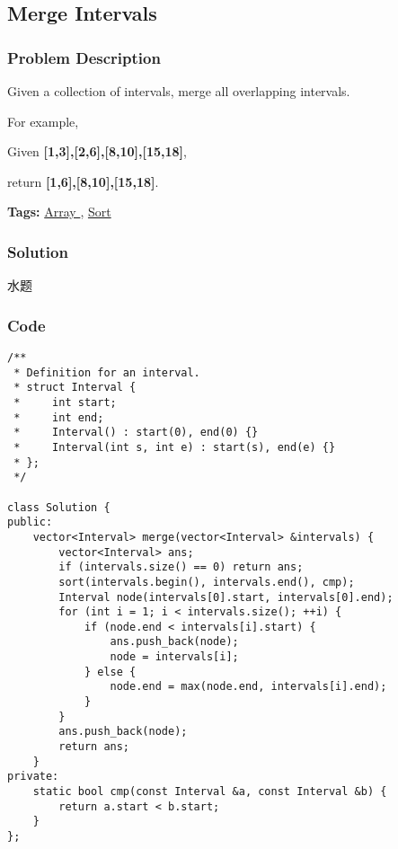 \documentclass{article}
\begin{document}
\begin{CJK*}{UTF8}{gkai}
\begin{lstlisting}
\end{lstlisting}


\subsection{ Merge Intervals }
\label{ Merge Intervals }

\subsubsection*{Problem Description}
Given a collection of intervals, merge all overlapping intervals.

For example,


Given \textbf{[1,3],[2,6],[8,10],[15,18]},


return \textbf{[1,6],[8,10],[15,18]}.


\textbf{Tags: }
\hyperref[ Array ]{ Array },  \hyperref[ Sort ]{ Sort }



\subsubsection*{Solution}
水题

\subsubsection*{Code}
\begin{lstlisting}
/**
 * Definition for an interval.
 * struct Interval {
 *     int start;
 *     int end;
 *     Interval() : start(0), end(0) {}
 *     Interval(int s, int e) : start(s), end(e) {}
 * };
 */
 
class Solution {
public:
    vector<Interval> merge(vector<Interval> &intervals) {
        vector<Interval> ans;
        if (intervals.size() == 0) return ans;
        sort(intervals.begin(), intervals.end(), cmp);
        Interval node(intervals[0].start, intervals[0].end);
        for (int i = 1; i < intervals.size(); ++i) {
            if (node.end < intervals[i].start) {
                ans.push_back(node);
                node = intervals[i];
            } else {
                node.end = max(node.end, intervals[i].end);
            }
        }
        ans.push_back(node);
        return ans;
    }
private:
    static bool cmp(const Interval &a, const Interval &b) {
        return a.start < b.start;
    }
}; 
\end{lstlisting}



\end{CJK*}
\end{document}
